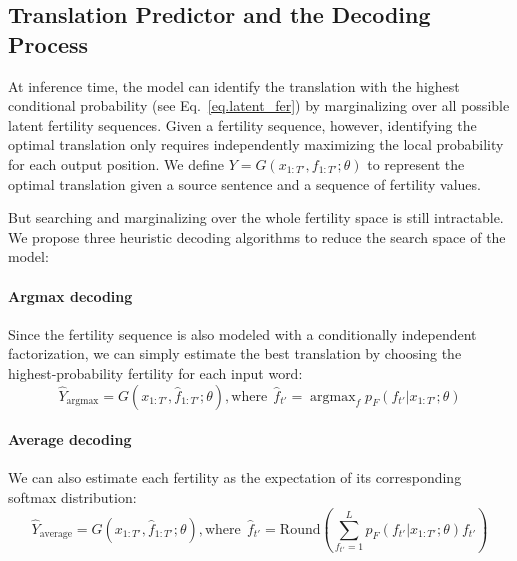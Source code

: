 \documentclass{article} %
\DeclareMathOperator*{\argmax}{argmax} %
\begin{document}
\subsection{Translation Predictor and the Decoding Process}
At inference time, the model can identify the translation with the highest conditional probability (see Eq.~\ref{eq.latent_fer}) by marginalizing over all possible latent fertility sequences. 
Given a fertility sequence, however, identifying the optimal translation only requires independently maximizing the local probability for each output position.
We define $Y = G(x_{1:T'}, f_{1:T'}; \theta)$ to represent the optimal translation given a source sentence and a sequence of fertility values.

But searching and marginalizing over the whole fertility space is still intractable. We propose three heuristic decoding algorithms to reduce the search space of the \model{} model:

\vspace{-5pt}
\paragraph{Argmax decoding} Since the fertility sequence is also modeled with a conditionally independent factorization, we can simply estimate the best translation by choosing the highest-probability fertility for each input word:
\begin{equation}
	\hat{Y}_\text{argmax} = G(x_{1:T'}, \hat{f}_{1:T'};\theta), \textrm{where} \ \ \hat{f}_{t'}=\argmax_f p_F(f_{t'}|x_{1:T'};\theta)
\end{equation}

\vspace{-5pt}
\paragraph{Average decoding}
We can also estimate each fertility as the expectation of its corresponding softmax distribution:
\begin{equation}
	\hat{Y}_\text{average} = G(x_{1:T'}, \hat{f}_{1:T'};\theta), \textrm{where} \ \ \hat{f}_{t'}=\textrm{Round}\left(\sum_{f_{t'}=1}^L p_F(f_{t'}|x_{1:T'};\theta)f_{t'}\right)
    \label{eq.average}
\end{equation}
\end{document}
